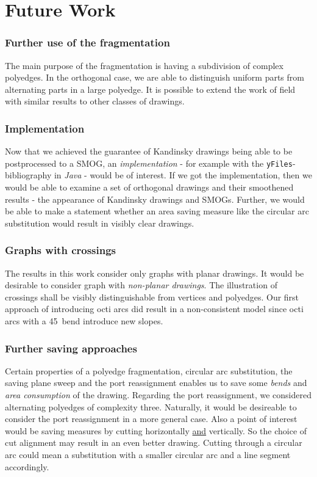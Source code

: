 \section{Future Work}
\subsubsection*{Further use of the fragmentation}
The main purpose of the fragmentation is having a subdivision of complex polyedges. In the orthogonal case, we are able to distinguish uniform parts from alternating parts in a large polyedge. It is possible to extend the work of field with similar results to other classes of drawings.
\subsubsection*{Implementation}
Now that we achieved the guarantee of Kandinsky drawings being able to be postprocessed to a SMOG, an \textit{implementation} - for example with the \texttt{yFiles}-bibliography in \textit{Java} - would be of interest. If we got the implementation, then we would be able to examine a set of orthogonal drawings and their smoothened results - the appearance of Kandinsky drawings and SMOGs. Further, we would be able to make a statement whether an area saving measure like the circular arc substitution would result in visibly clear drawings. 
\subsubsection*{Graphs with crossings}
The results in this work consider only graphs with planar drawings. It would be desirable to consider graph with \textit{non-planar drawings}. The illustration of crossings shall be visibly distinguishable from vertices and polyedges. Our first approach of introducing octi arcs did result in a non-consistent model since octi arcs with a 45\degree~bend introduce new slopes. 
\subsubsection*{Further saving approaches}
Certain properties of a polyedge fragmentation, circular arc substitution, the saving plane sweep and the port reassignment enables us to save some \textit{bends} and \textit{area consumption} of the drawing. Regarding the port reassignment, we considered alternating polyedges of complexity three. Naturally, it would be desireable to consider the port reassignment in a more general case. Also a point of interest would be saving measures by cutting horizontally \underline{and} vertically. So the choice of cut alignment may result in an even better drawing. Cutting through a circular arc could mean a substitution with a smaller circular arc and a line segment accordingly.